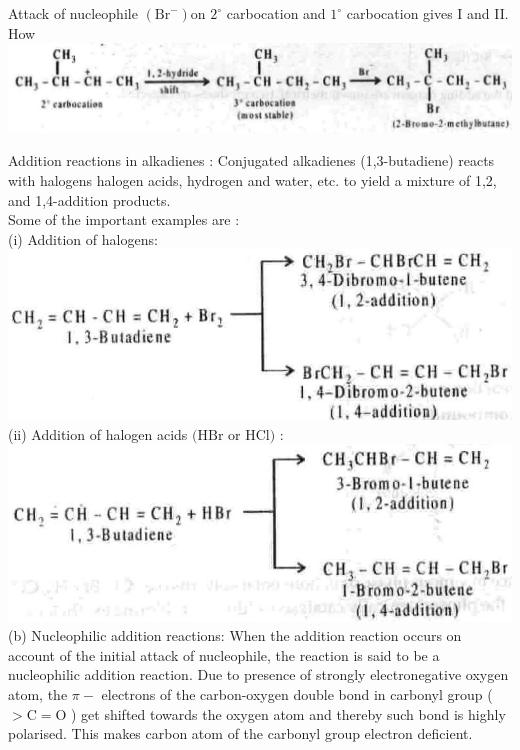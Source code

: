 \documentclass[10pt]{article}
\begin{document}
Attack of nucleophile $\left(\mathrm{Br}^{-}\right)$on $2^{\circ}$ carbocation and $1^{\circ}$ carbocation gives I and II. How\\
\includegraphics[max width=\textwidth, center]{2025_01_28_8470952b98110cec3aabg-096(2)}

Addition reactions in alkadienes : Conjugated alkadienes (1,3-butadiene) reacts with halogens halogen acids, hydrogen and water, etc. to yield a mixture of 1,2, and 1,4-addition products.\\
Some of the important examples are :\\
(i) Addition of halogens:\\
\includegraphics[max width=\textwidth, center]{2025_01_28_8470952b98110cec3aabg-097(4)}\\
(ii) Addition of halogen acids $(\mathrm{HBr}$ or HCl$)$ :\\
\includegraphics[max width=\textwidth, center]{2025_01_28_8470952b98110cec3aabg-097(2)}\\
(b) Nucleophilic addition reactions: When the addition reaction occurs on account of the initial attack of nucleophile, the reaction is said to be a nucleophilic addition reaction. Due to presence of strongly electronegative oxygen atom, the $\pi-$ electrons of the carbon-oxygen double bond in carbonyl group ( $>\mathrm{C}=\mathrm{O}$ ) get shifted towards the oxygen atom and thereby such bond is highly polarised. This makes carbon atom of the carbonyl group electron deficient.\\
\end{document}
